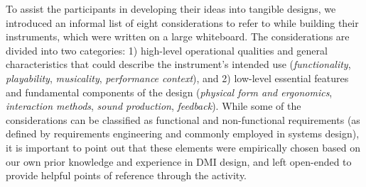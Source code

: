 \documentclass[letterpaper, 12pt]{article}
\begin{document}
To assist the participants in developing their ideas into tangible designs, we introduced an informal list of eight considerations to refer to while building their instruments, which were written on a large whiteboard. The considerations are divided into two categories: 1) high-level operational qualities and general characteristics that could describe the instrument's intended use (\emph{functionality}, \emph{playability}, \emph{musicality}, \emph{performance context}), and 2) low-level essential features and fundamental components of the design (\emph{physical form and ergonomics}, \emph{interaction methods}, \emph{sound production}, \emph{feedback}).
While some of the considerations can be classified as functional and non-functional requirements (as defined by requirements engineering \citep{Glinz2007} and commonly employed in systems design), it is important to point out that these elements were empirically chosen based on our own prior knowledge and experience in DMI design, and left open-ended to provide helpful points of reference through the activity. 
\end{document}
